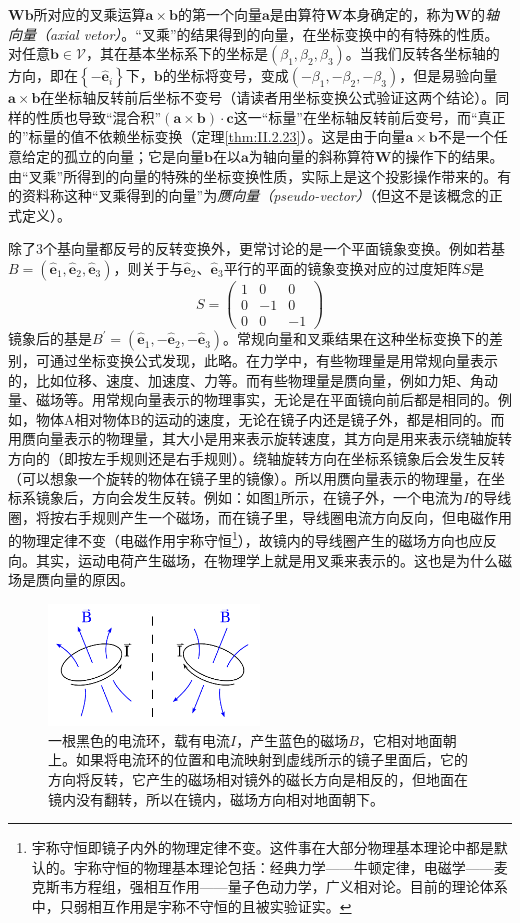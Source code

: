 \documentclass[../main.tex]{subfiles}
\begin{document}
$\mathbf{Wb}$所对应的叉乘运算$\mathbf{a}\times\mathbf{b}$的第一个向量$\mathbf{a}$是由算符$\mathbf{W}$本身确定的，称为$\mathbf{W}$的\emph{轴向量（axial vetor）}。“叉乘”的结果得到的向量，在坐标变换中的有特殊的性质。对任意$\mathbf{b}\in\mathcal{V}$，其在基本坐标系下的坐标是$\left(\beta_1,\beta_2,\beta_3\right)$。当我们反转各坐标轴的方向，即在$\left\{-\mathbf{\hat{e}}_i\right\}$下，$\mathbf{b}$的坐标将变号，变成$\left(-\beta_1,-\beta_2,-\beta_3\right)$，但是易验向量$\mathbf{a}\times\mathbf{b}$在坐标轴反转前后坐标不变号（请读者用坐标变换公式验证这两个结论）。同样的性质也导致“混合积”$\left(\mathbf{a}\times\mathbf{b}\right)\cdot\mathbf{c}$这一“标量”在坐标轴反转前后变号，而“真正的”标量的值不依赖坐标变换（定理\ref{thm:II.2.23}）。这是由于向量$\mathbf{a}\times\mathbf{b}$不是一个任意给定的孤立的向量；它是向量$\mathbf{b}$在以$\mathbf{a}$为轴向量的斜称算符$\mathbf{W}$的操作下的结果。由“叉乘”所得到的向量的特殊的坐标变换性质，实际上是这个投影操作带来的。有的资料称这种“叉乘得到的向量”为\emph{赝向量（pseudo-vector）}（但这不是该概念的正式定义）。

除了3个基向量都反号的反转变换外，更常讨论的是一个平面镜象变换。例如若基$B=\left(\mathbf{\hat{e}}_1,\mathbf{\hat{e}}_2,\mathbf{\hat{e}}_3\right)$，则关于与$\mathbf{\hat{e}}_2$、$\mathbf{\hat{e}}_3$平行的平面的镜象变换对应的过度矩阵$S$是
\[S=\left(\begin{array}{ccc}1&0&0\\0&-1&0\\0&0&-1\end{array}\right)\]
镜象后的基是$B^\prime=\left(\mathbf{\hat{e}}_1,-\mathbf{\hat{e}}_2,-\mathbf{\hat{e}}_3\right)$。常规向量和叉乘结果在这种坐标变换下的差别，可通过坐标变换公式发现，此略。在力学中，有些物理量是用常规向量表示的，比如位移、速度、加速度、力等。而有些物理量是赝向量，例如力矩、角动量、磁场等。用常规向量表示的物理事实，无论是在平面镜向前后都是相同的。例如，物体A相对物体B的运动的速度，无论在镜子内还是镜子外，都是相同的。而用赝向量表示的物理量，其大小是用来表示旋转速度，其方向是用来表示绕轴旋转方向的（即按左手规则还是右手规则）。绕轴旋转方向在坐标系镜象后会发生反转（可以想象一个旋转的物体在镜子里的镜像）。所以用赝向量表示的物理量，在坐标系镜象后，方向会发生反转。例如：如图\ref{fig:II.3.3}所示，在镜子外，一个电流为$I$的导线圈，将按右手规则产生一个磁场，而在镜子里，导线圈电流方向反向，但电磁作用的物理定律不变（电磁作用宇称守恒\footnote{宇称守恒即镜子内外的物理定律不变。这件事在大部分物理基本理论中都是默认的。宇称守恒的物理基本理论包括：经典力学——牛顿定律，电磁学——麦克斯韦方程组，强相互作用——量子色动力学，广义相对论。目前的理论体系中，只弱相互作用是宇称不守恒的且被实验证实。}），故镜内的导线圈产生的磁场方向也应反向。其实，运动电荷产生磁场，在物理学上就是用叉乘来表示的。这也是为什么磁场是赝向量的原因。

\begin{figure}[ht]
    \centering
    \includegraphics[width=0.5\textwidth]{images/BIsAPseudovector.pdf}
    \caption{一根黑色的电流环，载有电流$I$，产生蓝色的磁场$B$，它相对地面朝上。如果将电流环的位置和电流映射到虚线所示的镜子里面后，它的方向将反转，它产生的磁场相对镜外的磁长方向是相反的，但地面在镜内没有翻转，所以在镜内，磁场方向相对地面朝下。}
    \label{fig:II.3.3}
\end{figure}
\end{document}
